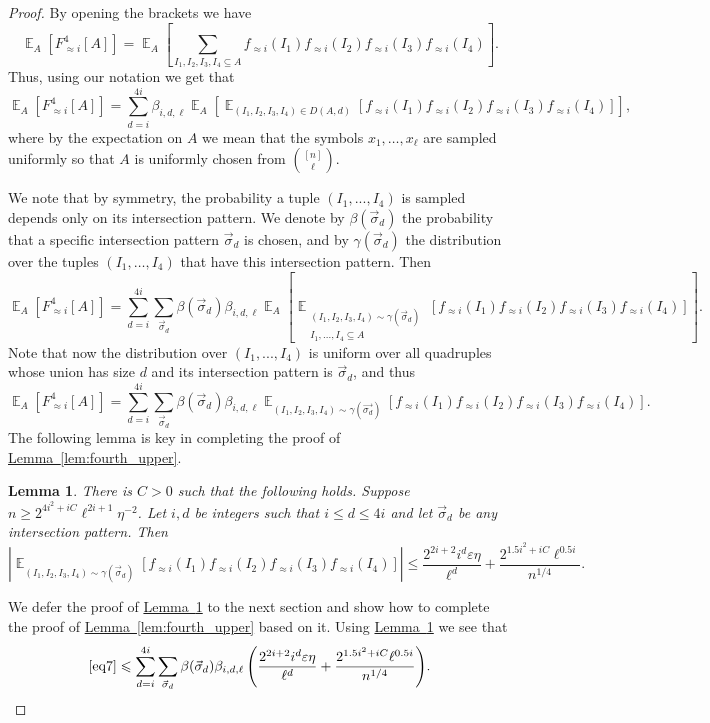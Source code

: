 \documentclass[11pt]{article}
\newcommand{\expref}[2]{\texorpdfstring{\hyperref[#2]{#1~\ref{#2}}}{#1~\ref{#2}}}
\newtheorem{lemma}[theorem]{Lemma}
\newcommand\card[1]{\left| {#1} \right|}
\newcommand\Expect[2]{{\mathop{\mathbb{E}}_{#1}\left[ {#2} \right]}}
\newcommand\eps{\varepsilon}
\renewcommand\geq{\geqslant}
\renewcommand\leq{\leqslant}
\newcommand\approxlvlfn[2]{{#1}_{\approx{#2}}}
\begin{document}
\begin{proof}
By opening the brackets we have
\[
\Expect{A}{\approxlvlfn{F}{i}^4[A]}
=\Expect{A}{
\sum\limits_{I_1,I_2,I_3,I_4\subseteq A}
{
\approxlvlfn{f}{i}(I_1)\approxlvlfn{f}{i}(I_2)\approxlvlfn{f}{i}(I_3)\approxlvlfn{f}{i}(I_4)
}
}.
\]
Thus, using our %
notation  %
we get that
\[
\Expect{A}{\approxlvlfn{F}{i}^4[A]}
=\sum\limits_{d=i}^{4i}{\beta_{i,d,\ell}
\Expect{A}{\Expect{(I_1,I_2,I_3,I_4)\in D(A,d)}{
\approxlvlfn{f}{i}(I_1)\approxlvlfn{f}{i}(I_2)\approxlvlfn{f}{i}(I_3)\approxlvlfn{f}{i}(I_4)
}}},
\]
where by the expectation on $A$ we mean that the symbols $x_1,\ldots,x_{\ell}$ are sampled uniformly so that $A$ is uniformly chosen from $\binom{[n]}{\ell}$.
%


We note that by symmetry, the probability a tuple $(I_1,...,I_4)$ is sampled depends only
on its intersection pattern. We denote by $\beta(\vec{\sigma}_d)$ the probability that a
specific intersection pattern $\vec{\sigma}_d$ is chosen, and by $\gamma(\vec{\sigma}_d)$
the distribution over the tuples $(I_1,\ldots,I_4)$ that have this intersection pattern.
Then
\begin{equation}\label{eq7}
\Expect{A}{\approxlvlfn{F}{i}^4[A]}
=
\sum\limits_{d=i}^{4i}{
\sum\limits_{\vec{\sigma}_d}{
\beta(\vec{\sigma}_d)\beta_{i,d,\ell}
\Expect{A}{\Expect{\substack{(I_1,I_2,I_3,I_4) \sim \gamma(\vec{\sigma}_d)\\ I_1,...,I_4\subseteq A}}
{\approxlvlfn{f}{i}(I_1)\approxlvlfn{f}{i}(I_2)\approxlvlfn{f}{i}(I_3)\approxlvlfn{f}{i}(I_4)
}}}}.
\end{equation}
Note that now the distribution over $(I_1,...,I_4)$ is uniform over all quadruples whose union has size
$d$ and its intersection pattern is $\vec{\sigma}_d$, and thus
\[
\Expect{A}{\approxlvlfn{F}{i}^4[A]}
=\sum\limits_{d=i}^{4i}{
\sum\limits_{\vec{\sigma}_d}{
\beta(\vec{\sigma}_d)\beta_{i,d,\ell}
\Expect{(I_1,I_2,I_3,I_4) \sim \gamma(\vec{\sigma_d})}{
\approxlvlfn{f}{i}(I_1)\approxlvlfn{f}{i}(I_2)\approxlvlfn{f}{i}(I_3)\approxlvlfn{f}{i}(I_4)
}}}.
\]
The following lemma is key in completing the proof of \expref{Lemma}{lem:fourth_upper}.
\begin{lemma}\label{lem:fourth_core}
There is $C>0$ such that the following holds. Suppose $n\geq 2^{4i^2+iC} \ell^{2i+1}\eta^{-2}$.
Let $i,d$ be integers such that $i\leq d\leq 4i$ and let $\vec{\sigma}_d$ be any intersection pattern.
Then
\[
\card{
\Expect{(I_1,I_2,I_3,I_4) \sim \gamma(\vec{\sigma}_d)}{
\approxlvlfn{f}{i}(I_1)\approxlvlfn{f}{i}(I_2)\approxlvlfn{f}{i}(I_3)\approxlvlfn{f}{i}(I_4)
}}
\leq
\frac{2^{2i+2} i^{d} \eps\eta}{\ell^{d}}+\frac{2^{1.5i^2+iC} \ell^{0.5i}}{n^{1/4}}.
\]
\end{lemma}
We defer the proof of \expref{Lemma}{lem:fourth_core} to the next section and show how to complete the proof of \expref{Lemma}{lem:fourth_upper}
based on it. Using \expref{Lemma}{lem:fourth_core} we see that
\[
\eqref{eq7}
\leq
\sum\limits_{d=i}^{4i}{
\sum\limits_{\vec{\sigma}_d}{
\beta(\vec{\sigma}_d)\beta_{i,d,\ell}
\left(
\frac{2^{2i+2} i^{d} \eps\eta}{\ell^{d}}+\frac{2^{1.5i^2+iC} \ell^{0.5i}}{n^{1/4}}
\right)
}}.
\]


\end{proof}
\end{document}
